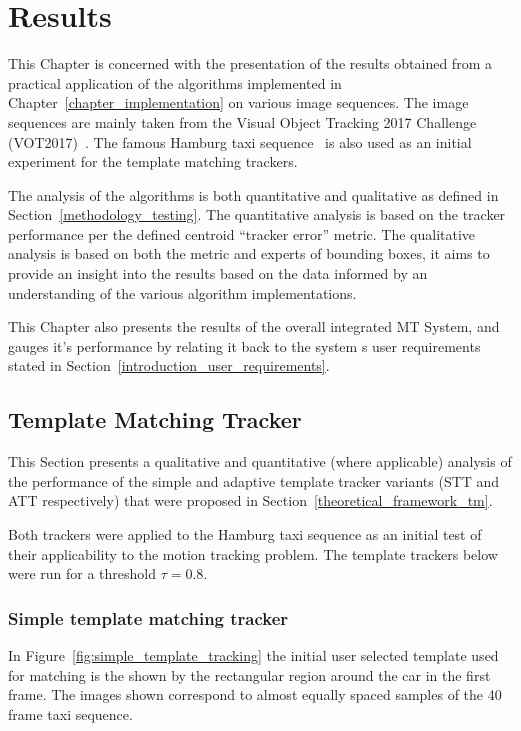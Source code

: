 \chapter{Results}\label{chapter_results}

This Chapter is concerned with the presentation of the results obtained from a practical
application of the algorithms implemented in
Chapter~\ref{chapter_implementation} on various image sequences. 
The image sequences are mainly taken from the Visual Object Tracking 2017
Challenge (VOT2017)~\cite{VOT2017}. The famous Hamburg taxi
sequence~\cite{Hamburg} is also used as an
initial experiment for the template matching trackers.

The analysis of the algorithms is both quantitative and qualitative as defined
in Section~\ref{methodology_testing}. The
quantitative analysis is based on the tracker performance per the defined centroid
``tracker error'' metric. The qualitative analysis is based on both the metric
and experts of bounding boxes, it aims to provide an insight into the results
based on the data informed by an understanding of the various algorithm
implementations. 

This Chapter also presents the results of the overall integrated MT System, and
gauges it's performance by relating it back to the system
s user requirements stated in Section~\ref{introduction_user_requirements}.


\section{Template Matching Tracker}
This Section presents a qualitative and quantitative (where applicable) analysis
of the performance of the simple and
adaptive template tracker variants (STT and ATT respectively) that were proposed
in Section~\ref{theoretical_framework_tm}. 

Both trackers were applied to the Hamburg taxi sequence  as an initial
test of their applicability to the motion tracking problem.
The template trackers below were run for a threshold $\tau=0.8$.

\subsection{Simple template matching tracker}\label{results_simple_template_matching}
In Figure~\ref{fig:simple_template_tracking} the initial user selected template used for matching is the shown by the rectangular region around the car
in the first frame. The images shown correspond to almost equally spaced
samples of the 40 frame taxi sequence.

